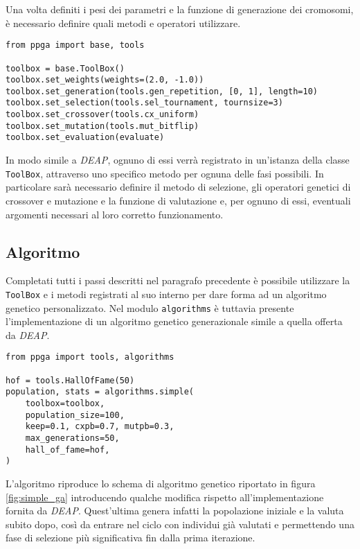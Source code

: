 Una volta definiti i pesi dei parametri e la funzione di generazione dei
cromosomi, è necessario definire quali metodi e operatori utilizzare.

\begin{lstlisting}[caption={Utilizzo classe ToolBox PPGA}]
from ppga import base, tools

toolbox = base.ToolBox()
toolbox.set_weights(weights=(2.0, -1.0))
toolbox.set_generation(tools.gen_repetition, [0, 1], length=10)
toolbox.set_selection(tools.sel_tournament, tournsize=3)
toolbox.set_crossover(tools.cx_uniform)
toolbox.set_mutation(tools.mut_bitflip)
toolbox.set_evaluation(evaluate)
\end{lstlisting}

In modo simile a \textit{DEAP}, ognuno di essi verrà registrato in un'istanza
della classe \verb|ToolBox|, attraverso uno specifico metodo per ognuna delle
fasi possibili. In particolare sarà necessario definire il metodo di selezione,
gli operatori genetici di crossover e mutazione e la funzione di valutazione e,
per ognuno di essi, eventuali argomenti necessari al loro corretto funzionamento.

\subsection{Algoritmo}

Completati tutti i passi descritti nel paragrafo precedente è possibile
utilizzare la \verb|ToolBox| e i metodi registrati al suo interno per dare
forma ad un algoritmo genetico personalizzato. Nel modulo \verb|algorithms| è
tuttavia presente l'implementazione di un algoritmo genetico generazionale
simile a quella offerta da \textit{DEAP}.

\begin{lstlisting}[caption={Utilizzo algoritmo PPGA}]
from ppga import tools, algorithms

hof = tools.HallOfFame(50)
population, stats = algorithms.simple(
	toolbox=toolbox,
	population_size=100,
	keep=0.1, cxpb=0.7, mutpb=0.3,
	max_generations=50,
	hall_of_fame=hof,
)
\end{lstlisting}

L'algoritmo riproduce lo schema di algoritmo genetico riportato in figura
\ref{fig:simple_ga} introducendo qualche modifica rispetto all'implementazione
fornita da \textit{DEAP}. Quest'ultima genera infatti la popolazione iniziale e
la valuta subito dopo, così da entrare nel ciclo con individui già valutati e
permettendo una fase di selezione più significativa fin dalla prima iterazione.

